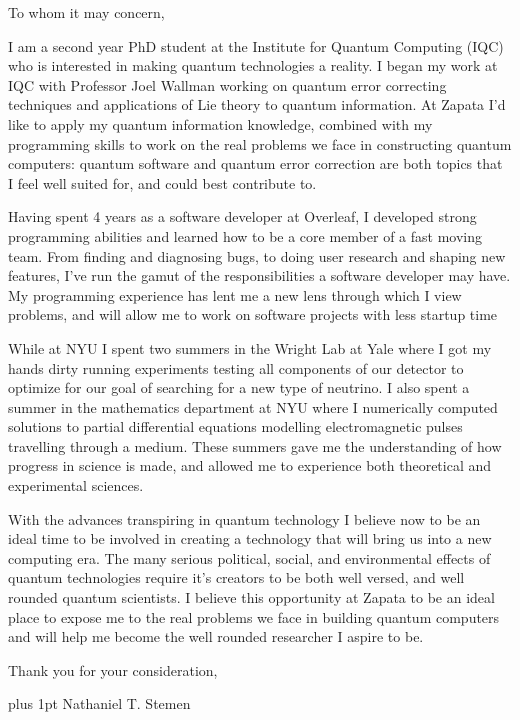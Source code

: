 \documentclass[12pt]{article}
\begin{document}
\noindent
To whom it may concern,

I am a second year PhD student at the Institute for Quantum Computing (IQC) who is interested in making quantum technologies a reality.
I began my work at IQC with Professor Joel Wallman working on quantum error correcting techniques and applications of Lie theory to quantum information.
At Zapata I'd like to apply my quantum information knowledge, combined with my programming skills to work on the real problems we face in constructing quantum computers: quantum software and quantum error correction are both topics that I feel well suited for, and could best contribute to.

Having spent 4 years as a software developer at Overleaf, I developed strong programming abilities and learned how to be a core member of a fast moving team.
From finding and diagnosing bugs, to doing user research and shaping new features, I've run the gamut of the responsibilities a software developer may have.
My programming experience has lent me a new lens through which I view problems, and will allow me to work on software projects with less startup time

While at NYU I spent two summers in the Wright Lab at Yale where I got my hands dirty running experiments testing all components of our detector to optimize for our goal of searching for a new type of neutrino.
I also spent a summer in the mathematics department at NYU where I numerically computed solutions to partial differential equations modelling electromagnetic pulses travelling through a medium.
These summers gave me the understanding of how progress in science is made, and allowed me to experience both theoretical and experimental sciences.

With the advances transpiring in quantum technology I believe now to be an ideal time to be involved in creating a technology that will bring us into a new computing era.
The many serious political, social, and environmental effects of quantum technologies require it's creators to be both well versed, and well rounded quantum scientists.
I believe this opportunity at Zapata to be an ideal place to expose me to the real problems we face in building quantum computers and will help me become the well rounded researcher I aspire to be.

\noindent
Thank you for your consideration,

\parskip=0pt plus 1pt
Nathaniel T. Stemen
\end{document}
